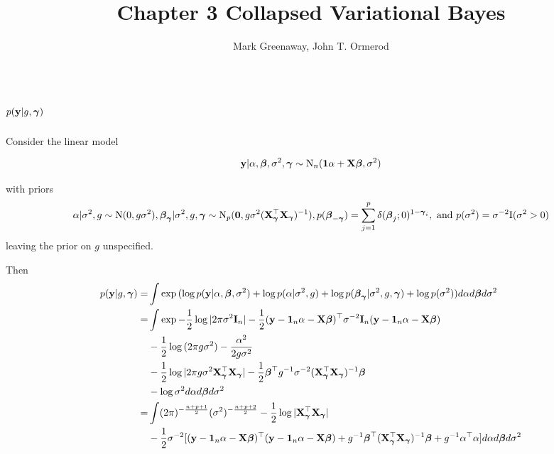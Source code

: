 \documentclass{amsart}[12pt]
\title{Chapter 3 Collapsed Variational Bayes}
\author{Mark Greenaway, John T. Ormerod}
\theoremstyle{definition}
\begin{document}
\section{$p({\bf y} | g, {\boldsymbol \gamma})$}

Consider the linear model

\[
	{\bf y} | \alpha, {\boldsymbol \beta}, \sigma^2, {\boldsymbol \gamma} \sim \text{N}_n({\bf 1} \alpha + {\bf X} {\boldsymbol \beta}, \sigma^2)
\]

with priors
\[
	\alpha | \sigma^2, g \sim \text{N}(0, g \sigma^2),
	{\boldsymbol \beta}_{\boldsymbol \gamma} | \sigma^2, g, {\boldsymbol \gamma} \sim \text{N}_p({\bf 0}, g \sigma^2 ({\bf X}_{\boldsymbol \gamma}^\top {\bf X}_{\boldsymbol \gamma})^{-1}),
	p({\boldsymbol \beta}_{-{\boldsymbol \gamma}}) = \sum_{j=1}^p \delta({\boldsymbol \beta}_j; 0)^{1 - {\boldsymbol \gamma}_i}, \text{ and }
	p(\sigma^2) = \sigma^{-2} \text{I}(\sigma^2 > 0)
\]
leaving the prior on $g$ unspecified.

Then
\begin{align*}
	p({\bf y} | g, {\boldsymbol \gamma}) =& \int \exp{(\log p({\bf y}| \alpha, {\boldsymbol\beta}, \sigma^2) + \log p(\alpha | \sigma^2, g)
														+ \log p({\boldsymbol\beta}_{\boldsymbol\gamma}| \sigma^2, g, {\boldsymbol\gamma}) + \log p(\sigma^2))} d \alpha d {\boldsymbol \beta} d \sigma^2 \\
		=& \int \exp{-\frac{1}{2} \log |2 \pi \sigma^2 {\bf I}_n| - \frac{1}{2} ({\bf y}- {\bf1}_n \alpha - {\bf X}{\boldsymbol\beta})^\top \sigma^{-2} {\bf I}_n ({\bf y}- {\bf1}_n \alpha - {\bf X}{\boldsymbol\beta}) } \\
		&-\frac{1}{2} \log{(2 \pi g \sigma^2)} - \frac{\alpha^2}{2 g \sigma^2} \\
		&-\frac{1}{2} \log{|2\pi g \sigma^2 {\bf X}_{\boldsymbol\gamma}^\top {\bf X}_{\boldsymbol\gamma}|} - \frac{1}{2} {\boldsymbol \beta}^\top g^{-1} \sigma^{-2} ({\bf X}_{\boldsymbol \gamma}^\top {\bf X}_{\boldsymbol \gamma})^{-1} {\boldsymbol \beta} \\
		&- \log{\sigma^2} d \alpha d {\boldsymbol \beta} d \sigma^2 \\
		=& \int (2 \pi)^{-\frac{n + p + 1}{2}} (\sigma^2)^{-\frac{n + p + 2}{2}} - \frac{1}{2} \log |{\bf X}_{\boldsymbol \gamma}^\top {\bf X}_{\boldsymbol \gamma}| \\
		&-\frac{1}{2}\sigma^{-2}[({\bf y} - {\bf 1}_n \alpha - {\bf X} {\boldsymbol \beta})^\top ({\bf y} - {\bf 1}_n \alpha - {\bf X} {\boldsymbol \beta})
		+ g^{-1} {\boldsymbol \beta}^\top ({\bf X}_{\boldsymbol \gamma}^\top {\bf X}_{\boldsymbol \gamma})^{-1} {\boldsymbol \beta}
		+ g^{-1} \alpha^\top \alpha] d \alpha d {\boldsymbol \beta} d \sigma^2
\end{align*}
\end{document}
